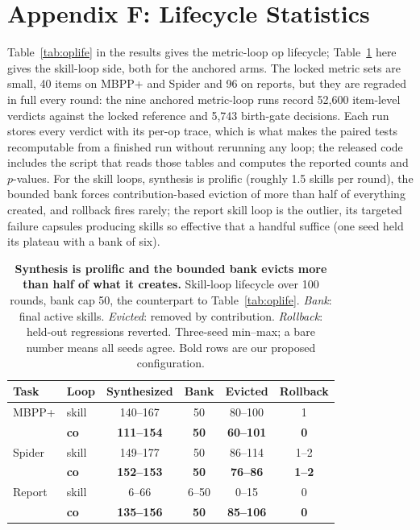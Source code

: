\documentclass[letterpaper]{article} %
\begin{document}
\section{Appendix F: Lifecycle Statistics}
\label{app:lifecycle}

Table~\ref{tab:oplife} in the results gives the metric-loop op lifecycle; Table~\ref{tab:skilllife} here gives the skill-loop side, both for the anchored arms. The locked metric sets are small, 40 items on MBPP+ and Spider and 96 on reports, but they are regraded in full every round: the nine anchored metric-loop runs record 52{,}600 item-level verdicts against the locked reference and 5{,}743 birth-gate decisions. Each run stores every verdict with its per-op trace, which is what makes the paired tests recomputable from a finished run without rerunning any loop; the released code includes the script that reads those tables and computes the reported counts and $p$-values. For the skill loops, synthesis is prolific (roughly 1.5 skills per round), the bounded bank forces contribution-based eviction of more than half of everything created, and rollback fires rarely; the report skill loop is the outlier, its targeted failure capsules producing skills so effective that a handful suffice (one seed held its plateau with a bank of six).

\begin{table}[t]
\centering
\footnotesize
\setlength{\tabcolsep}{2.2pt}
\begin{tabular}{llcccc}
\toprule
Task & Loop & Synthesized & Bank & Evicted & Rollback \\
\midrule
MBPP+ & skill & 140--167 & 50 & 80--100 & 1 \\
 & \textbf{co} & \textbf{111--154} & \textbf{50} & \textbf{60--101} & \textbf{0} \\
Spider & skill & 149--177 & 50 & 86--114 & 1--2 \\
 & \textbf{co} & \textbf{152--153} & \textbf{50} & \textbf{76--86} & \textbf{1--2} \\
Report & skill & 6--66 & 6--50 & 0--15 & 0 \\
 & \textbf{co} & \textbf{135--156} & \textbf{50} & \textbf{85--106} & \textbf{0} \\
\bottomrule
\end{tabular}
\caption{\textbf{Synthesis is prolific and the bounded bank evicts more than half of what it creates.} Skill-loop lifecycle over 100 rounds, bank cap 50, the counterpart to Table~\ref{tab:oplife}. \emph{Bank}: final active skills. \emph{Evicted}: removed by contribution. \emph{Rollback}: held-out regressions reverted. Three-seed min--max; a bare number means all seeds agree. Bold rows are our proposed configuration.}
\label{tab:skilllife}
\end{table}
\end{document}
